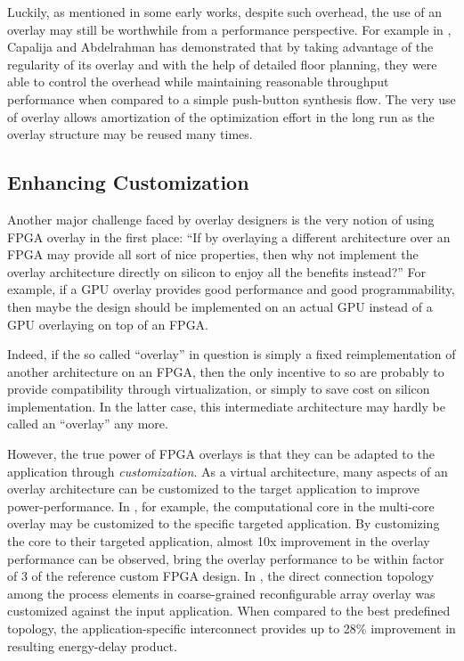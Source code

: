 Luckily, as mentioned in some early works, despite such overhead, the use of an overlay may still be worthwhile from a performance perspective.  For example in \cite{capalijia2013pipelined}, Capalija and Abdelrahman has demonstrated that by taking advantage of the regularity of its overlay and with the help of detailed floor planning, they were able to control the overhead while maintaining reasonable throughput performance when compared to a simple push-button synthesis flow.
The very use of overlay allows amortization of the optimization effort in the long run as the overlay structure may be reused many times.

\subsection{Enhancing Customization}
Another major challenge faced by overlay designers is the very notion of using FPGA overlay in the first place:
``If by overlaying a different architecture over an FPGA may provide all sort of nice properties, then why not implement the overlay architecture directly on silicon to enjoy all the benefits instead?''
For example, if a GPU overlay provides good performance and good programmability, then maybe the design should be implemented on an actual GPU instead of a GPU overlaying on top of an FPGA.

Indeed, if the so called ``overlay'' in question is simply a fixed reimplementation of another architecture on an FPGA, then the only incentive to so are probably to provide compatibility through virtualization, or simply to save cost on silicon implementation.
In the latter case, this intermediate architecture may hardly be called an ``overlay'' any more.

However, the true power of FPGA overlays is that they can be adapted to the application through \emph{customization}.
As a virtual architecture, many aspects of an overlay architecture can be customized to the target application to improve power-performance.
In \cite{Lebedev2010}, for example, the computational core in the multi-core overlay may be customized to the specific targeted application.
By customizing the core to their targeted application, almost 10x improvement in the overlay performance can be observed, bring the overlay performance to be within factor of 3 of the reference custom FPGA design.
In \cite{Lin:2012:EDC:2460216.2460227}, the direct connection topology among the process elements in coarse-grained reconfigurable array overlay was customized against the input application. 
When compared to the best predefined topology, the application-specific interconnect provides up to 28\% improvement in resulting energy-delay product.

